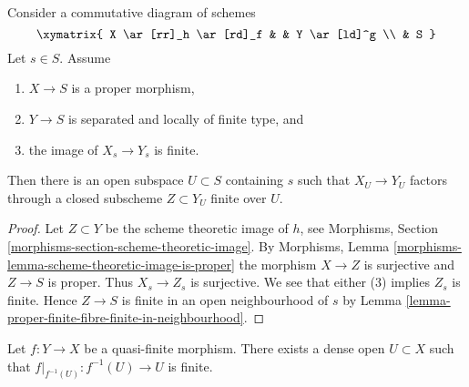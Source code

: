 \begin{lemma}
\label{lemma-flat-proper-family-cannot-collapse-fibre}
Consider a commutative diagram of schemes
$$
\xymatrix{
X \ar[rr]_h \ar[rd]_f & & Y \ar[ld]^g \\
& S
}
$$
Let $s \in S$. Assume
\begin{enumerate}
\item $X \to S$ is a proper morphism,
\item $Y \to S$ is separated and locally of finite type, and
\item the image of $X_s \to Y_s$ is finite.
\end{enumerate}
Then there is an open
subspace $U \subset S$ containing $s$ such that $X_U \to Y_U$
factors through a closed subscheme $Z \subset Y_U$ finite over $U$.
\end{lemma}

\begin{proof}
Let $Z \subset Y$ be the scheme theoretic image of $h$, see
Morphisms, Section \ref{morphisms-section-scheme-theoretic-image}.
By Morphisms, Lemma \ref{morphisms-lemma-scheme-theoretic-image-is-proper}
the morphism $X \to Z$ is surjective and $Z \to S$ is proper.
Thus $X_s \to Z_s$ is surjective. We see that either
(3) implies $Z_s$ is finite.
Hence $Z \to S$ is finite in an open neighbourhood of $s$ by
Lemma \ref{lemma-proper-finite-fibre-finite-in-neighbourhood}.
\end{proof}

\begin{lemma}
\label{lemma-quasi-finite-finite-over-dense-open}
Let $f : Y \to X$ be a quasi-finite morphism.
There exists a dense open $U \subset X$ such that
$f|_{f^{-1}(U)} : f^{-1}(U) \to U$ is finite.
\end{lemma}

